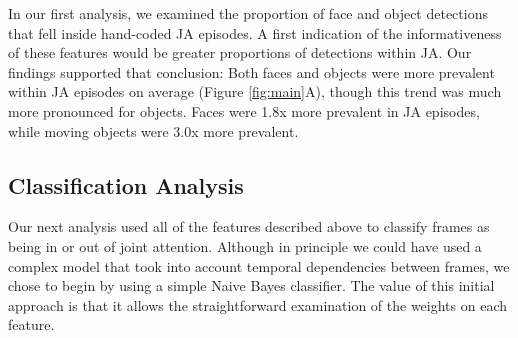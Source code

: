 \documentclass[10pt,letterpaper]{article}
\begin{document}
In our first analysis, we examined the proportion of face and object detections that fell inside hand-coded JA episodes. A first indication of the informativeness of these features would be greater proportions of detections within JA. Our findings supported that conclusion: Both faces and objects were more prevalent within JA episodes on average (Figure \ref{fig:main}A), though this trend was much more pronounced for objects. Faces were 1.8x more prevalent in JA episodes, while moving objects were 3.0x more prevalent. 

\subsection{Classification Analysis}


Our next analysis used all of the features described above to classify frames as being in or out of joint attention. Although in principle we could have used a complex model that took into account temporal dependencies between frames, we chose to begin by using a simple Naive Bayes classifier. The value of this initial approach is that it allows the straightforward examination of the weights on each feature. 
\end{document}
